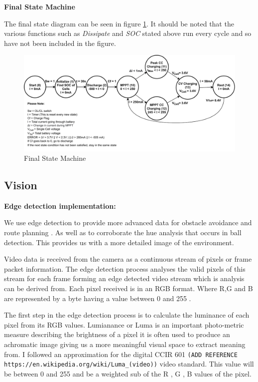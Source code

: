\documentclass[10pt,twoside]{article}
\begin{document}
\textbf{Final State Machine}

The final state diagram can be seen in figure \ref{fig:FinalState}. It should be noted that the various functions such as \textit{Dissipate} and \textit{SOC} stated above run every cycle and so have not been included in the figure.  

\begin{figure}[hbt]
    \centering
    \includegraphics[width = \textwidth]{Final (2).pdf}
    \caption{Final State Machine}
    \label{fig:FinalState}
\end{figure}

\newpage
\subsection{Vision}

\textbf{Edge detection implementation:}

We use edge detection to provide more advanced data for obstacle avoidance and route planning . As well as to corroborate the hue analysis that occurs in ball detection. This provides us with a more detailed image of the environment. 

Video data is received from the camera as a continuous stream of pixels or frame packet information. The edge detection process analyses the valid pixels of this stream for each frame forming an edge detected video stream which is analysis can be derived from. Each pixel received is in an RGB format. Where R,G and B are represented by a byte having a value between 0 and 255 . 

The first step in the edge detection process is to calculate the luminance of each pixel from its RGB values. Lumianance or Luma is an important photo-metric measure describing the brightness of a pixel it is often used to produce an achromatic image giving us a more meaningful visual space to extract meaning from. I followed an approximation for the digital CCIR 601 \verb|(ADD REFERENCE https://en.wikipedia.org/wiki/Luma_(video))| video standard. This value will be between 0 and 255 and be a weighted sub of the R , G , B values of the pixel. 
\end{document}
